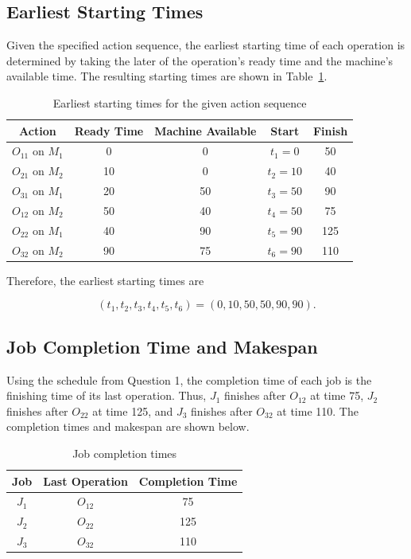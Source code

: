 \documentclass[a4paper,12pt]{article}
\begin{document}
\subsection{Earliest Starting Times}

Given the specified action sequence, the earliest starting time of each operation is determined by taking the later of the operation's ready time and the machine's available time. The resulting starting times are shown in Table~\ref{tab:earliest-start}.

\begin{table}[ht]
	\centering
	\caption{Earliest starting times for the given action sequence}
	\label{tab:earliest-start}
	\begin{tabular}{c c c c c}
		\hline
		\textbf{Action} & \textbf{Ready Time} & \textbf{Machine Available} & \textbf{Start} & \textbf{Finish} \\
		\hline
		$O_{11}$ on $M_1$ & 0  & 0  & $t_1=0$  & 50 \\
		$O_{21}$ on $M_2$ & 10 & 0  & $t_2=10$ & 40 \\
		$O_{31}$ on $M_1$ & 20 & 50 & $t_3=50$ & 90 \\
		$O_{12}$ on $M_2$ & 50 & 40 & $t_4=50$ & 75 \\
		$O_{22}$ on $M_1$ & 40 & 90 & $t_5=90$ & 125 \\
		$O_{32}$ on $M_2$ & 90 & 75 & $t_6=90$ & 110 \\
		\hline
	\end{tabular}
\end{table}

Therefore, the earliest starting times are

$$
(t_1,t_2,t_3,t_4,t_5,t_6)=(0,10,50,50,90,90).
$$

\subsection{Job Completion Time and Makespan}

Using the schedule from Question 1, the completion time of each job is the finishing time of its last operation. Thus, $J_1$ finishes after $O_{12}$ at time 75, $J_2$ finishes after $O_{22}$ at time 125, and $J_3$ finishes after $O_{32}$ at time 110. The completion times and makespan are shown below.

\begin{table}[ht]
	\centering
	\caption{Job completion times}
	\label{tab:completion-times}
	\begin{tabular}{c c c}
		\hline
		\textbf{Job} & \textbf{Last Operation} & \textbf{Completion Time} \\
		\hline
		$J_1$ & $O_{12}$ & 75 \\
		$J_2$ & $O_{22}$ & 125 \\
		$J_3$ & $O_{32}$ & 110 \\
		\hline
	\end{tabular}
\end{table}
\end{document}
